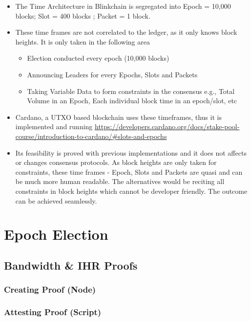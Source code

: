 \documentclass[a4paper,11pt]{article}
\begin{document}
\begin{itemize}
\item The Time Architecture in Blinkchain is segregated into Epoch = 10,000 blocks; Slot = 400 blocks ; Packet = 1 block.
\item These time frames are not correlated to the ledger, as it only knows block heights. It is only taken in the following area
\begin{itemize}
\item Election conducted every epoch (10,000 blocks)
\item Announcing Leaders for every Epochs, Slots and Packets
\item Taking Variable Data to form constraints in the consensus e.g., Total Volume in an Epoch, Each individual block time in an epoch/slot, etc
\end{itemize}
\item Cardano, a UTXO based blockchain uses these timeframes, thus it is implemented and running \url{https://developers.cardano.org/docs/stake-pool-course/introduction-to-cardano/#slots-and-epochs}
\item Its feasibility is proved with previous implementations and it does not affects or changes consensus protocols. As block heights are only taken for constraints, these time frames - Epoch, Slots and Packets are quasi and can be much more human readable. The alternatives would be reciting all constraints in block heights which cannot be developer friendly. The outcome can be achieved seamlessly.
\end{itemize}

\section{Epoch Election}



\subsection{Bandwidth \& IHR Proofs}

\subsubsection{Creating Proof (Node)}

\subsubsection{Attesting Proof (Script)}
\end{document}
